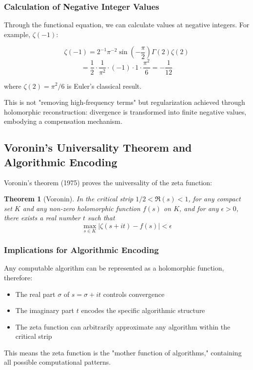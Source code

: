 \documentclass[11pt]{article}
\newtheorem{theorem}{Theorem}[section]
\begin{document}
\subsubsection{Calculation of Negative Integer Values}

Through the functional equation, we can calculate values at negative integers. For example, $\zeta(-1)$:

$$\zeta(-1) = 2^{-1} \pi^{-2} \sin\left(-\frac{\pi}{2}\right) \Gamma(2) \zeta(2)$$
$$= \frac{1}{2} \cdot \frac{1}{\pi^2} \cdot (-1) \cdot 1 \cdot \frac{\pi^2}{6} = -\frac{1}{12}$$

where $\zeta(2) = \pi^2/6$ is Euler's classical result.

This is not "removing high-frequency terms" but regularization achieved through holomorphic reconstruction: divergence is transformed into finite negative values, embodying a compensation mechanism.

\subsection{Voronin's Universality Theorem and Algorithmic Encoding}

Voronin's theorem (1975) proves the universality of the zeta function:

\begin{theorem}[Voronin]
In the critical strip $1/2 < \Re(s) < 1$, for any compact set $K$ and any non-zero holomorphic function $f(s)$ on $K$, and for any $\epsilon > 0$, there exists a real number $t$ such that
$$\max_{s \in K} |\zeta(s + it) - f(s)| < \epsilon$$
\end{theorem}

\subsubsection{Implications for Algorithmic Encoding}

Any computable algorithm can be represented as a holomorphic function, therefore:
\begin{itemize}
\item The real part $\sigma$ of $s = \sigma + it$ controls convergence
\item The imaginary part $t$ encodes the specific algorithmic structure
\item The zeta function can arbitrarily approximate any algorithm within the critical strip
\end{itemize}

This means the zeta function is the "mother function of algorithms," containing all possible computational patterns.
\end{document}

